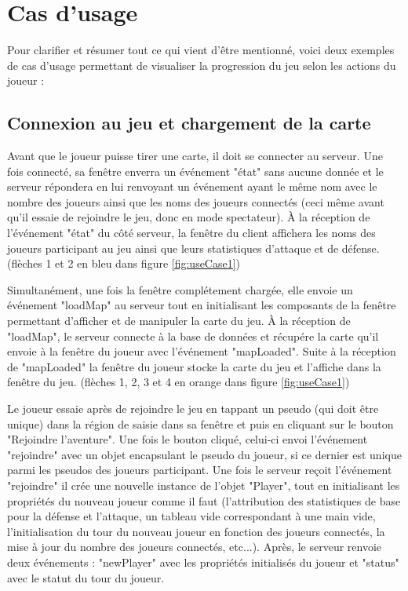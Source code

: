 \documentclass[12pt]{report}
\begin{document}
	\section{Cas d'usage}
	Pour clarifier et résumer tout ce qui vient d'être mentionné, voici deux exemples de cas d'usage permettant de visualiser la progression du jeu selon les actions du joueur :

	  	\subsection{Connexion au jeu et chargement de la carte}
			Avant que le joueur puisse tirer une carte, il doit se connecter au serveur. Une fois connecté, sa fenêtre enverra un événement "état" sans aucune donnée et le serveur répondera en lui renvoyant un événement ayant le même nom avec le nombre des joueurs ainsi que les noms des joueurs connectés (ceci même avant qu'il essaie de rejoindre le jeu, donc en mode spectateur). À la réception de l'événement "état" du côté serveur, la fenêtre du client affichera les noms des joueurs participant au jeu ainsi que leurs statistiques d'attaque et de défense. (flèches 1 et 2 en bleu dans figure \ref{fig:useCase1})

			Simultanément, une fois la fenêtre complétement chargée, elle envoie un événement "loadMap" au serveur tout en initialisant les composants de la fenêtre permettant d'afficher et de manipuler la carte du jeu. À la réception de "loadMap", le serveur connecte à la base de données et récupére la carte qu'il envoie à la fenêtre du joueur avec l'événement "mapLoaded". Suite à la réception de "mapLoaded" la fenêtre du joueur stocke la carte du jeu et l'affiche dans la fenêtre du jeu. (flèches 1, 2, 3 et 4 en orange dans figure \ref{fig:useCase1})

			Le joueur essaie après de rejoindre le jeu en tappant un pseudo (qui doit être unique) dans la région de saisie dans sa fenêtre et puis en cliquant sur le bouton "Rejoindre l'aventure". Une fois le bouton cliqué, celui-ci envoi l'événement "rejoindre" avec un objet encapsulant le pseudo du joueur, si ce dernier est unique parmi les pseudos des joueurs participant. Une fois le serveur reçoit l'événement "rejoindre" il crée une nouvelle instance de l'objet "Player", tout en initialisant les propriétés du nouveau joueur comme il faut (l'attribution des statistiques de base pour la défense et l'attaque, un tableau vide correspondant à une main vide, l'initialisation du tour du nouveau joueur en fonction des joueurs connectés, la mise à jour du nombre des joueurs connectés, etc...). Après, le serveur renvoie deux événements : "newPlayer" avec les propriétés initialisés du joueur et "status" avec le statut du tour du joueur.
\end{document}
